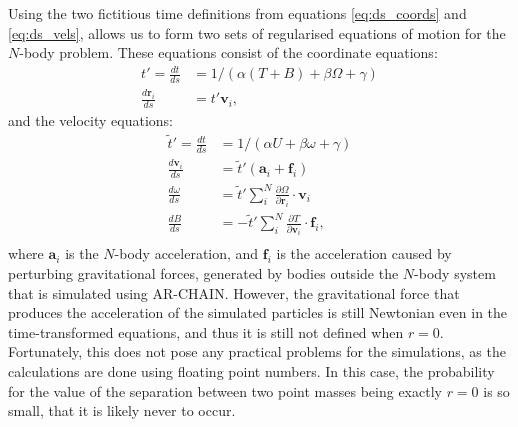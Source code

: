 \documentclass[english, twoside]{HYgradu}
\begin{document}
Using the two fictitious time definitions from equations \ref{eq:ds_coords} and \ref{eq:ds_vels}, allows us to form two sets of regularised equations of motion for the $N$-body problem. These equations consist of the coordinate equations:
\begin{equation}
\begin{split}
t' = \frac{dt}{ds} &= 1/(\alpha(T+B) + \beta\Omega + \gamma) \\
\frac{d\mathbf{r}_i}{ds} &= t' \mathbf{v}_i,
\end{split}
\end{equation}
and the velocity equations:
\begin{equation}
\begin{split}
\tilde{t}' = \frac{dt}{ds} &= 1/(\alpha U + \beta\omega + \gamma) \\
\frac{d\mathbf{v}_i}{ds} &= \tilde{t}' (\mathbf{a}_i + \mathbf{f}_i) \\
\frac{d\omega}{ds} &= \tilde{t}' \displaystyle\sum^N_i \frac{\partial \Omega}{\partial \mathbf{r}_i} \cdot \mathbf{v}_i \\
\frac{dB}{ds} &= -\tilde{t}' \displaystyle\sum^N_i \frac{\partial T}{\partial \mathbf{v}_i} \cdot \mathbf{f}_i, \\
\end{split}
\end{equation}
where $\mathbf{a}_i$ is the $N$-body acceleration, and $\mathbf{f}_i$ is the acceleration caused by perturbing gravitational forces, generated by bodies outside the $N$-body system that is simulated using AR-CHAIN. However, the gravitational force that produces the acceleration of the simulated particles is still Newtonian even in the time-transformed equations, and thus it is still not defined when $r=0$. Fortunately, this does not pose any practical problems for the simulations, as the calculations are done using floating point numbers. In this case, the probability for the value of the separation between two point masses being exactly $r=0$ is so small, that it is likely never to occur.
\end{document}
